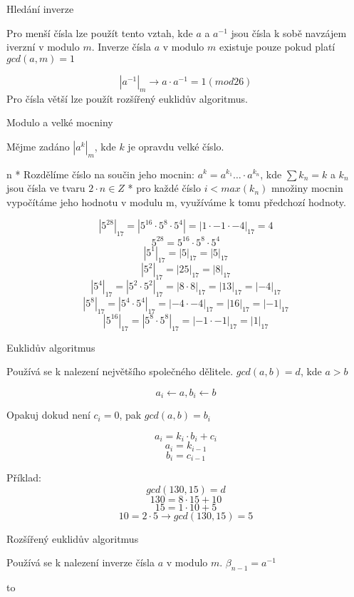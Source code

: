 \sec Hledání inverze

Pro menší čísla lze použít tento vztah, kde $a$ a $a^{-1}$ jsou čísla k sobě navzájem iverzní v modulo $m$.
Inverze čísla $a$ v modulo $m$ existuje pouze pokud platí $gcd(a,m) = 1$

$$
|a^{-1}|_{m} \rightarrow a \cdot a^{-1} = 1 (mod 26)
$$
\noindent
Pro čísla větší lze použít rozšířený euklidův algoritmus.

\sec Modulo a velké mocniny

Mějme zadáno $\left|a^k\right|_m$, kde $k$ je opravdu velké číslo.

\begitems \style n
* Rozdělíme číslo na součin jeho mocnin: $a^k=a^{k_1} \ldots \cdot a^{k_n}$, kde $\sum k_n = k$ a $k_n$ jsou čísla ve tvaru $2 \cdot n \in Z$
* pro každé číslo $i < max(k_n)$ množiny mocnin vypočítáme jeho hodnotu v modulu m, využíváme k tomu předchozí hodnoty.
\enditems

$$\left|5^{28}\right|_{17} = \left|5^{16} \cdot 5^8 \cdot 5^4\right| = \left|1 \cdot -1 \cdot -4\right|_{17} = 4$$
$$5^{28} = 5^{16} \cdot 5^8 \cdot 5^4$$
$$\left|5^1\right|_{17} = \left|5 \right|_{17} = \left|5\right|_{17}$$
$$\left|5^2\right|_{17} = \left|25 \right|_{17} = \left|8\right|_{17}$$
$$\left|5^4\right|_{17} = \left|5^2 \cdot 5^2\right|_{17} = \left|8 \cdot 8\right|_{17} = \left|13\right|_{17} = \left|-4\right|_{17}$$
$$\left|5^8\right|_{17} = \left|5^4 \cdot 5^4\right|_{17} = \left|-4 \cdot -4\right|_{17} = \left|16\right|_{17} = \left|-1\right|_{17}$$
$$\left|5^{16}\right|_{17} = \left|5^8 \cdot 5^8\right|_{17} = \left|-1 \cdot -1\right|_{17} = \left|1\right|_{17}$$

\sec Euklidův algoritmus

Používá se k nalezení největšího společného dělitele. $gcd(a,b) = d$, kde $a > b$

$$a_i \leftarrow a, b_i \leftarrow b$$
\centerline{Opakuj dokud není $c_i = 0$, pak $gcd(a,b) = b_i$}
$$a_i = k_i \cdot b_i + c_i$$
$$a_i = k_{i-1}$$
$$b_i = c_{i-1}$$

\noindent
Příklad:
$$gcd(130,15) = d$$
$$130 = 8 \cdot 15 + 10$$
$$15 = 1 \cdot 10 + 5$$
$$10 = 2 \cdot 5 \rightarrow gcd(130,15) = 5$$

\sec Rozšířený euklidův algoritmus

Používá se k nalezení inverze čísla $a$ v modulo $m$. $\beta_{n-1} = a^{-1}$

\hbox to 

